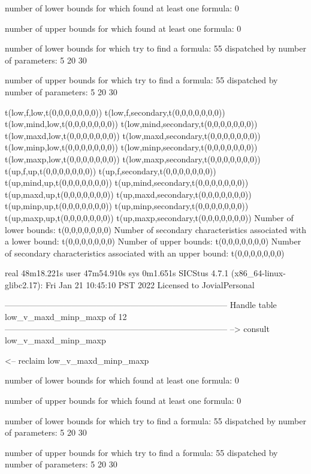 number of lower bounds for which found at least one formula: 0

number of upper bounds for which found at least one formula: 0

number of lower bounds for which try to find a formula: 55
dispatched by number of parameters: 5  20  30

number of upper bounds for which try to find a formula: 55
dispatched by number of parameters: 5  20  30

t(low,f,low,t(0,0,0,0,0,0,0))
t(low,f,secondary,t(0,0,0,0,0,0,0))
t(low,mind,low,t(0,0,0,0,0,0,0))
t(low,mind,secondary,t(0,0,0,0,0,0,0))
t(low,maxd,low,t(0,0,0,0,0,0,0))
t(low,maxd,secondary,t(0,0,0,0,0,0,0))
t(low,minp,low,t(0,0,0,0,0,0,0))
t(low,minp,secondary,t(0,0,0,0,0,0,0))
t(low,maxp,low,t(0,0,0,0,0,0,0))
t(low,maxp,secondary,t(0,0,0,0,0,0,0))
t(up,f,up,t(0,0,0,0,0,0,0))
t(up,f,secondary,t(0,0,0,0,0,0,0))
t(up,mind,up,t(0,0,0,0,0,0,0))
t(up,mind,secondary,t(0,0,0,0,0,0,0))
t(up,maxd,up,t(0,0,0,0,0,0,0))
t(up,maxd,secondary,t(0,0,0,0,0,0,0))
t(up,minp,up,t(0,0,0,0,0,0,0))
t(up,minp,secondary,t(0,0,0,0,0,0,0))
t(up,maxp,up,t(0,0,0,0,0,0,0))
t(up,maxp,secondary,t(0,0,0,0,0,0,0))
Number of lower bounds:                                             t(0,0,0,0,0,0,0)
Number of secondary characteristics associated with a lower bound:  t(0,0,0,0,0,0,0)
Number of upper bounds:                                             t(0,0,0,0,0,0,0)
Number of secondary characteristics associated with an upper bound: t(0,0,0,0,0,0,0)

real	48m18.221s
user	47m54.910s
sys	0m1.651s
SICStus 4.7.1 (x86_64-linux-glibc2.17): Fri Jan 21 10:45:10 PST 2022
Licensed to JovialPersonal


--------------------------------------------------------------------------------
Handle table low_v_maxd_minp_maxp of 12
--------------------------------------------------------------------------------
--> consult low_v_maxd_minp_maxp

<-- reclaim low_v_maxd_minp_maxp

number of lower bounds for which found at least one formula: 0

number of upper bounds for which found at least one formula: 0

number of lower bounds for which try to find a formula: 55
dispatched by number of parameters: 5  20  30

number of upper bounds for which try to find a formula: 55
dispatched by number of parameters: 5  20  30


